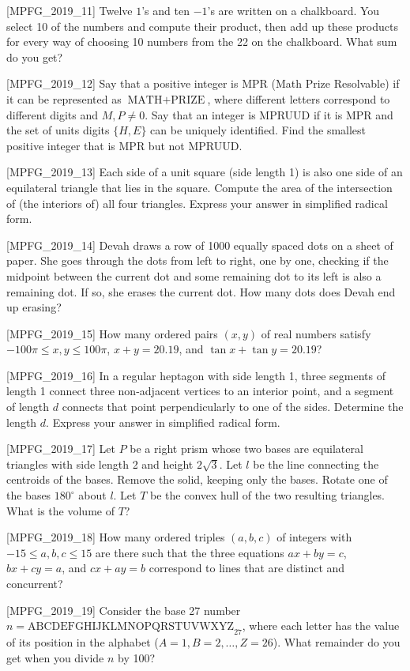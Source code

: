 [MPFG_2019_11]
Twelve $1$'s and ten $-1$'s are written on a chalkboard. You select 10 of the numbers and compute their product, then add up these products for every way of choosing 10 numbers from the 22 on the chalkboard. What sum do you get?

[MPFG_2019_12]
Say that a positive integer is MPR (Math Prize Resolvable) if it can be represented as $\text{MATH} + \text{PRIZE}$, where different letters correspond to different digits and $M, P \ne 0$. Say that an integer is MPRUUD if it is MPR and the set of units digits $\{H, E\}$ can be uniquely identified. Find the smallest positive integer that is MPR but not MPRUUD.

[MPFG_2019_13]
Each side of a unit square (side length 1) is also one side of an equilateral triangle that lies in the square. Compute the area of the intersection of (the interiors of) all four triangles. Express your answer in simplified radical form.

[MPFG_2019_14]
Devah draws a row of 1000 equally spaced dots on a sheet of paper. She goes through the dots from left to right, one by one, checking if the midpoint between the current dot and some remaining dot to its left is also a remaining dot. If so, she erases the current dot. How many dots does Devah end up erasing?

[MPFG_2019_15]
How many ordered pairs $(x, y)$ of real numbers satisfy $-100\pi \le x, y \le 100\pi$, $x+y=20.19$, and $\tan x + \tan y = 20.19$?

[MPFG_2019_16]
In a regular heptagon with side length 1, three segments of length 1 connect three non-adjacent vertices to an interior point, and a segment of length $d$ connects that point perpendicularly to one of the sides. Determine the length $d$. Express your answer in simplified radical form.

[MPFG_2019_17]
Let $P$ be a right prism whose two bases are equilateral triangles with side length 2 and height $2\sqrt{3}$. Let $l$ be the line connecting the centroids of the bases. Remove the solid, keeping only the bases. Rotate one of the bases $180^\circ$ about $l$. Let $T$ be the convex hull of the two resulting triangles. What is the volume of $T$?

[MPFG_2019_18]
How many ordered triples $(a, b, c)$ of integers with $-15 \le a, b, c \le 15$ are there such that the three equations $ax+by=c$, $bx+cy=a$, and $cx+ay=b$ correspond to lines that are distinct and concurrent?

[MPFG_2019_19]
Consider the base 27 number $n = \text{ABCDEFGHIJKLMNOPQRSTUVWXYZ}_{27}$, where each letter has the value of its position in the alphabet ($A=1, B=2, \dots, Z=26$). What remainder do you get when you divide $n$ by 100?

